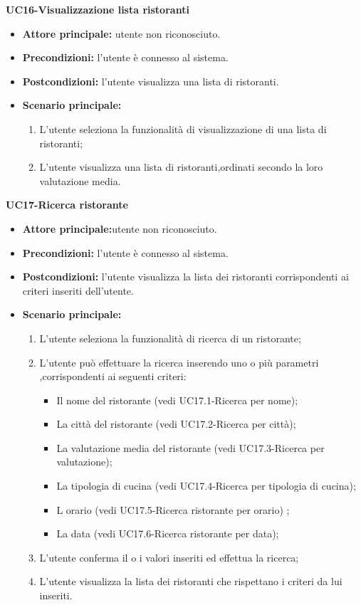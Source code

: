 \textbf{UC16-Visualizzazione lista ristoranti}
\begin{itemize}
\item \textbf{Attore principale:} utente non riconosciuto.
\item \textbf{Precondizioni:} l'utente è connesso al sistema.
\item \textbf{Postcondizioni:} l'utente visualizza una lista di ristoranti.
\item \textbf{Scenario principale:}
\begin{enumerate}
    \item L'utente seleziona la funzionalità di visualizzazione di una lista di ristoranti;
    \item L'utente visualizza una lista di ristoranti,ordinati secondo la loro valutazione media.
\end{enumerate}
\end{itemize}

\textbf{UC17-Ricerca ristorante}
\begin{itemize}
\item \textbf{Attore principale:}utente non riconosciuto.
\item \textbf{Precondizioni:} l'utente è connesso al sistema.
\item \textbf{Postcondizioni:} l'utente visualizza la lista dei ristoranti corrispondenti ai criteri inseriti
dell'utente.
\item \textbf{Scenario principale:}
\begin{enumerate}
    \item L'utente seleziona la funzionalità di ricerca di un ristorante;
    \item L'utente può effettuare la ricerca inserendo uno o più parametri ,corrispondenti
    ai seguenti criteri:
    \begin{itemize}
        \item Il nome del ristorante (vedi UC17.1-Ricerca per nome);
        \item La città del ristorante (vedi UC17.2-Ricerca per città);
        \item La valutazione media del ristorante (vedi UC17.3-Ricerca per valutazione);
        \item La tipologia di cucina (vedi UC17.4-Ricerca per tipologia di cucina);
        \item L orario (vedi UC17.5-Ricerca ristorante per orario) ;
        \item La data (vedi UC17.6-Ricerca ristorante per data); 
    \end{itemize}
    \item L'utente conferma il o i valori inseriti ed effettua la ricerca;
    \item L'utente visualizza la lista dei ristoranti che rispettano i criteri da lui inseriti.
\end{enumerate}
\end{itemize}

